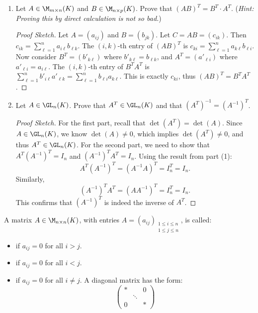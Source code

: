 \begin{exercise}
\begin{enumerate}
    \item Let $A \in \M_{m \times n}(K)$ and $B \in \M_{n \times p}(K)$. Prove that $(AB)^T = B^T \cdot A^T$. \newline (\textit{Hint: Proving this by direct calculation is not so bad.})
    \begin{proof}[Proof Sketch]
    Let $A = (a_{ij})$ and $B = (b_{jk})$. Let $C = AB = (c_{ik})$. Then $c_{ik} = \sum_{\ell=1}^n a_{i\ell} b_{\ell k}$.
    The $(i,k)$-th entry of $(AB)^T$ is $c_{ki} = \sum_{\ell=1}^n a_{k\ell} b_{\ell i}$.
    Now consider $B^T = (b'_{k\ell})$ where $b'_{k\ell} = b_{\ell k}$, and $A^T = (a'_{\ell i})$ where $a'_{\ell i} = a_{i\ell}$.
    The $(i,k)$-th entry of $B^T A^T$ is $\sum_{\ell=1}^n b'_{i\ell} a'_{\ell k} = \sum_{\ell=1}^n b_{\ell i} a_{k\ell}$.
    This is exactly $c_{ki}$, thus $(AB)^T = B^T A^T$.
    \end{proof}
    \item Let $A \in \GL_n(K)$. Prove that $A^T \in \GL_n(K)$ and that $(A^T)^{-1} = (A^{-1})^T$.
    \begin{proof}[Proof Sketch]
    For the first part, recall that $\det(A^T) = \det(A)$. Since $A \in \GL_n(K)$, we know $\det(A) \neq 0$, which implies $\det(A^T) \neq 0$, and thus $A^T \in \GL_n(K)$.
    For the second part, we need to show that $A^T (A^{-1})^T = I_n$ and $(A^{-1})^T A^T = I_n$. Using the result from part (1):
    \[ A^T (A^{-1})^T = (A^{-1}A)^T = I_n^T = I_n. \]
    Similarly,
    \[ (A^{-1})^T A^T = (AA^{-1})^T = I_n^T = I_n. \]
    This confirms that $(A^{-1})^T$ is indeed the inverse of $A^T$.
    \end{proof}
\end{enumerate}
\end{exercise}

\begin{definition}
\label{def:triangular_diagonal_matrices}
A matrix $A \in \M_{n \times n}(K)$, with entries $A = (a_{ij})_{\substack{1 \le i \le n \\ 1 \le j \le n}}$, is called:
\begin{itemize}
    \item {} if $a_{ij} = 0$ for all $i > j$.
    \item {} if $a_{ij} = 0$ for all $i < j$.
    \item {} if $a_{ij} = 0$ for all $i \neq j$. A diagonal matrix has the form:
    \begin{equation*}
        \begin{pmatrix} * & & 0 \\ & \ddots & \\ 0 & & * \end{pmatrix}
    \end{equation*}
\end{itemize}
\end{definition}

